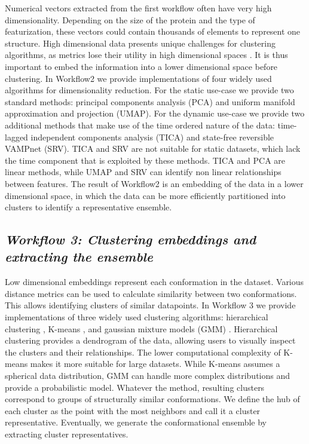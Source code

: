 \documentclass[unnumsec,webpdf,contemporary,large,numsquare]{oup-authoring-template}%
\theoremstyle{thmstyleone}%
\theoremstyle{thmstyletwo}%
\theoremstyle{thmstylethree}%
\begin{document}
Numerical vectors extracted from the first workflow often have very high dimensionality. Depending on the size of the protein and the type of featurization, these vectors could contain thousands of elements to represent one structure. High dimensional data presents unique challenges for clustering algorithms, as metrics lose their utility in high dimensional spaces \citep{novinskaya_improving_2015}. It is thus important to embed the information into a lower dimensional space before clustering. In Workflow2 we provide implementations of four widely used algorithms for dimensionality reduction. For the static use-case we provide two standard methods: principal components analysis (PCA) and uniform manifold approximation and projection (UMAP). For the dynamic use-case we provide two additional methods that make use of the time ordered nature of the data: time-lagged independent components analysis (TICA) and state-free reversible VAMPnet (SRV).  TICA and SRV are not suitable for static datasets, which lack the time component that is exploited by these methods. TICA and PCA are linear methods, while UMAP and SRV can identify non linear relationships between features. The result of Workflow2 is an embedding of the data in a lower dimensional space, in which the data can be more efficiently partitioned into clusters to identify a representative ensemble.

\subsection{\textit{\textbf{Workflow 3:} Clustering embeddings and extracting the ensemble}}\label{wf1}

Low dimensional embeddings represent each conformation in the dataset. Various distance metrics can be used to calculate similarity between two conformations. This allows identifying clusters of similar datapoints. In Workflow 3 we provide implementations of three widely used clustering algorithms: hierarchical clustering \citep{murtagh_algorithms_2012}, K-means \citep{hartigan_algorithm_1979}, and  gaussian mixture models (GMM) \citep{lindsay_mixture_1989}. Hierarchical clustering provides a dendrogram of the data, allowing users to visually inspect the clusters and their relationships. The lower computational complexity of K-means makes it more suitable for large datasets. While K-means assumes a spherical data distribution, GMM can handle more complex distributions and provide a probabilistic model. Whatever the method, resulting clusters correspond to groups of structurally similar conformations. We define the hub of each cluster as the point with the most neighbors and call it a cluster representative. Eventually, we generate the conformational ensemble by extracting cluster representatives.
\end{document}
